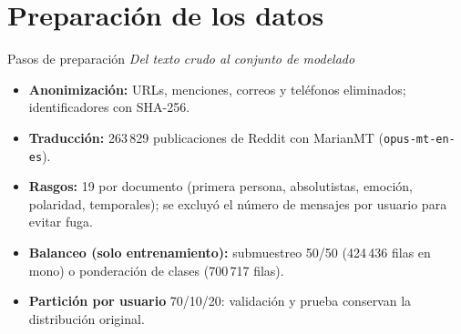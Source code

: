 ﻿\documentclass[11pt,aspectratio=169]{beamer}
\newcommand{\ugrsubtitle}[1]{%
  \vskip-0.25cm
  \small\textcolor{ugrGris}{\emph{#1}}\par
  \vskip0.15cm
}
\begin{document}
\section{Preparación de los datos}
\begin{frame}{Pasos de preparación}
  \ugrsubtitle{Del texto crudo al conjunto de modelado}
  \begin{itemize}
    \item \textbf{Anonimización:} URLs, menciones, correos y teléfonos eliminados; identificadores con SHA-256.
    \item \textbf{Traducción:} 263\,829 publicaciones de Reddit con MarianMT (\texttt{opus-mt-en-es}).
    \item \textbf{Rasgos:} 19 por documento (primera persona, absolutistas, emoción, polaridad, temporales); se excluyó el número de mensajes por usuario para evitar fuga.
    \item \textbf{Balanceo (solo entrenamiento):} submuestreo 50/50 (424\,436 filas en mono) o ponderación de clases (700\,717 filas).
    \item \textbf{Partición por usuario} 70/10/20: validación y prueba conservan la distribución original.
  \end{itemize}
\end{frame}
\end{document}
